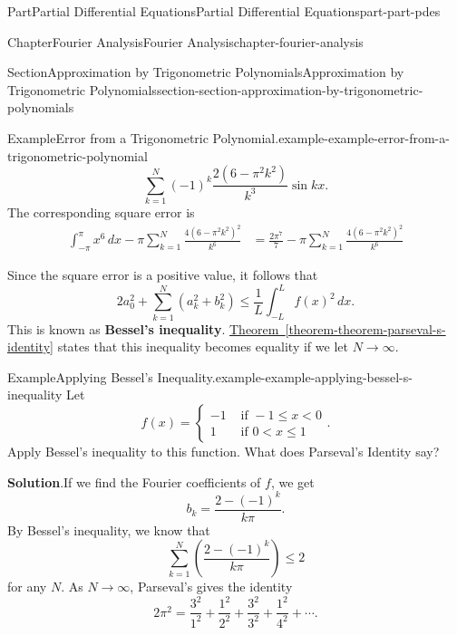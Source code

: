 \documentclass[twoside,10pt,]{book}
\newcommand{\blocktitlefont}{\relax}
\newcommand{\xreffont}{\relax}
\newcommand{\terminology}[1]{\textbf{#1}}
\numberwithin{equation}{part}
\newcommand{\amp}{&}
\begin{document}
\begin{partptx}{Part}{Partial Differential Equations}{}{Partial Differential Equations}{}{}{part-part-pdes}
\begin{chapterptx}{Chapter}{Fourier Analysis}{}{Fourier Analysis}{}{}{chapter-fourier-analysis}
\begin{sectionptx}{Section}{Approximation by Trigonometric Polynomials}{}{Approximation by Trigonometric Polynomials}{}{}{section-section-approximation-by-trigonometric-polynomials}
\begin{example}{Example}{Error from a Trigonometric Polynomial.}{example-example-error-from-a-trigonometric-polynomial}
\begin{equation*}
\sum_{k = 1}^{N}(-1)^{k}\frac{2(6 - \pi^{2}k^{2})}{k^{3}}\sin kx\text{.}
\end{equation*}
The corresponding square error is%
\begin{align*}
\int_{-\pi}^{\pi}x^{6}\,dx - \pi\sum_{k=1}^{N}\frac{4(6 - \pi^{2}k^{2})^{2}}{k^{6}} \amp = \frac{2\pi^{7}}{7} - \pi\sum_{k=1}^{N}\frac{4(6 - \pi^{2}k^{2})^{2}}{k^{6}} 
\end{align*}
%
\end{example}
Since the square error is a positive value, it follows that%
\begin{equation*}
2a_{0}^{2} + \sum_{k=1}^{N}(a_{k}^{2} + b_{k}^{2}) \leq \frac{1}{L}\int_{-L}^{L}f(x)^{2}\,dx\text{.}
\end{equation*}
This is known as \terminology{Bessel's inequality}. \hyperref[theorem-theorem-parseval-s-identity]{Theorem~{\xreffont\ref{theorem-theorem-parseval-s-identity}}} states that this inequality becomes equality if we let \(N\to\infty\).%
\begin{example}{Example}{Applying Bessel's Inequality.}{example-example-applying-bessel-s-inequality}%
Let%
\begin{equation*}
f(x) = \begin{cases} -1 \amp\text{ if } -1\leq x < 0 \\ 1 \amp\text{ if } 0 < x \leq 1 \end{cases}\text{.}
\end{equation*}
Apply Bessel's inequality to this function. What does Parseval's Identity say?%
\par\smallskip%
\noindent\textbf{\blocktitlefont Solution}.\hypertarget{solution-example-applying-bessel-s-inequality-c}{}\quad{}If we find the Fourier coefficients of \(f\), we get%
\begin{equation*}
b_{k} = \frac{2 - (-1)^{k}}{k\pi}\text{.}
\end{equation*}
By Bessel's inequality, we know that%
\begin{equation*}
\sum_{k=1}^{N}\left(\frac{2 - (-1)^{k}}{k\pi}\right) \leq 2
\end{equation*}
for any \(N\). As \(N\to\infty\), Parseval's gives the identity%
\begin{equation*}
2\pi^{2} = \frac{3^{2}}{1^{2}} + \frac{1^{2}}{2^{2}} + \frac{3^{2}}{3^{2}} + \frac{1^{2}}{4^{2}} + \cdots\text{.}
\end{equation*}
%
\end{example}
\end{sectionptx}

\end{chapterptx}
\end{partptx}
\end{document}
